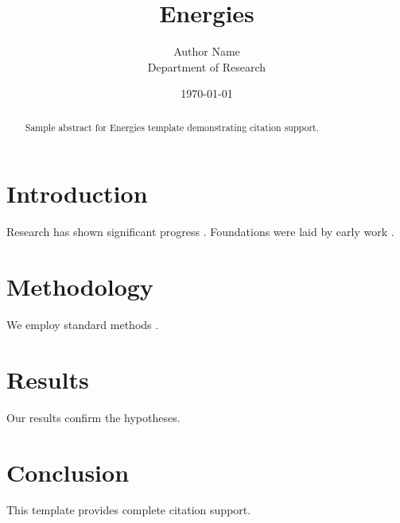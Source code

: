 \documentclass{mdpi}
\title{Energies}
\author{Author Name \\ \small Department of Research}
\date{\today}
\begin{document}
\maketitle

\begin{abstract}
Sample abstract for Energies template demonstrating citation support.
\end{abstract}

\section{Introduction}
Research has shown significant progress \citep{einstein1905}. Foundations were laid by early work \citep{turing1950}.

\section{Methodology}
We employ standard methods \citep{knuth1984}.

\section{Results}
Our results confirm the hypotheses.

\section{Conclusion}
This template provides complete citation support.



\end{document}
